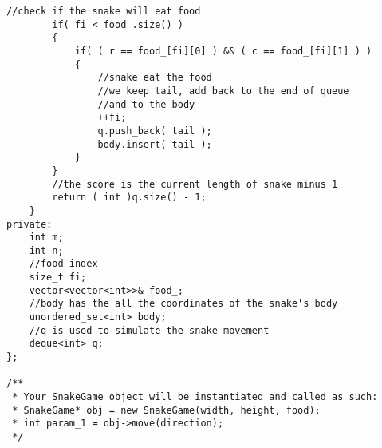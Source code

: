 \begin{lstlisting}[style=customc, caption={Queue}]
        //check if the snake will eat food
        if( fi < food_.size() )
        {
            if( ( r == food_[fi][0] ) && ( c == food_[fi][1] ) )
            {
                //snake eat the food
                //we keep tail, add back to the end of queue
                //and to the body
                ++fi;
                q.push_back( tail );
                body.insert( tail );
            }
        }
        //the score is the current length of snake minus 1
        return ( int )q.size() - 1;
    }
private:
    int m;
    int n;
    //food index
    size_t fi;
    vector<vector<int>>& food_;
    //body has the all the coordinates of the snake's body
    unordered_set<int> body;
    //q is used to simulate the snake movement
    deque<int> q;
};

/**
 * Your SnakeGame object will be instantiated and called as such:
 * SnakeGame* obj = new SnakeGame(width, height, food);
 * int param_1 = obj->move(direction);
 */
\end{lstlisting} 